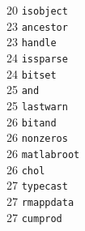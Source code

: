 \begin{footnotesize}
\begin{multicols}{3}
\vspace{-.153cm} 20    \hspace{.2cm} {\tt isobject            }    \\ %
\vspace{-.153cm} 23    \hspace{.2cm} {\tt ancestor            }    \\ %
\vspace{-.153cm} 23    \hspace{.2cm} {\tt handle              }    \\ %
\vspace{-.153cm} 24    \hspace{.2cm} {\tt issparse            }    \\ %
\vspace{-.153cm} 24    \hspace{.2cm} {\tt bitset              }    \\ %
\vspace{-.153cm} 25    \hspace{.2cm} {\tt and                 }    \\ %
\vspace{-.153cm} 25    \hspace{.2cm} {\tt lastwarn            }    \\ %
\vspace{-.153cm} 26    \hspace{.2cm} {\tt bitand              }    \\ %
\vspace{-.153cm} 26    \hspace{.2cm} {\tt nonzeros            }    \\ %
\vspace{-.153cm} 26    \hspace{.2cm} {\tt matlabroot          }    \\ %
\vspace{-.153cm} 26    \hspace{.2cm} {\tt chol                }    \\ %
\vspace{-.153cm} 27    \hspace{.2cm} {\tt typecast            }    \\ %
\vspace{-.153cm} 27    \hspace{.2cm} {\tt rmappdata           }    \\ %
\vspace{-.153cm} 27    \hspace{.2cm} {\tt cumprod             }    \\ %

\end{multicols}
\end{footnotesize}
